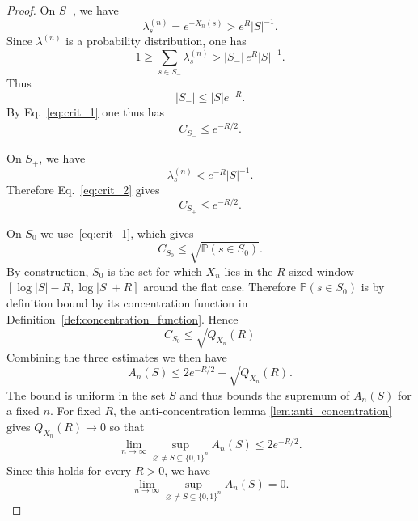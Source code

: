 \documentclass[aps,pra,reprint,superscriptaddress]{revtex4-2}
\newcommand{\nocontentsline}[3]{}
\newcommand\stoptoc{\let\addcontentsline\nocontentsline}
\theoremstyle{definition}
\theoremstyle{remark}
\begin{document}
\begin{proof}
        On \(S_-\), we have
        \begin{equation}
          \lambda_s^{(n)}=e^{-X_n(s)}>e^R|S|^{-1}.
        \end{equation}
        Since \(\lambda^{(n)}\) is a probability distribution, one has
        \begin{equation}
          1
          \ge
          \sum_{s\in S_-}\lambda_s^{(n)}
          >
          |S_-|\,e^R|S|^{-1}.
        \end{equation}
        Thus
        \begin{equation}
          |S_-|\le |S|e^{-R}.
        \end{equation}
        By Eq.~\eqref{eq:crit_1} one thus has
        \begin{align}
          C_{S_-}\le
          e^{-R/2}.
        \end{align}

        On \(S_+\), we have
        \begin{equation}
          \lambda_s^{(n)}<e^{-R}|S|^{-1}.
        \end{equation}
        Therefore Eq.~\eqref{eq:crit_2} gives
        \begin{equation}
          C_{S_+} \le  e^{-R/2}.
        \end{equation}

        On \(S_0\) we use~\eqref{eq:crit_1}, which gives
        \begin{equation}
            C_{S_0} \leq \sqrt{\mathbb P(s \in S_0)}.
        \end{equation}
        By construction, $S_0$ is the set for which $X_n$ lies in the
        $R$-sized window $[\log|S|-R,\log|S|+R]$ around the flat case. Therefore $\mathbb{P}(s \in S_0)$ is by definition bound by its
        concentration function in Definition~\ref{def:concentration_function}.
        Hence
          \begin{equation}
              C_{S_0} \leq \sqrt{Q_{X_n}(R)}
          \end{equation}
        Combining the three estimates we then have
        \begin{equation}
          A_n(S)
          \le
          2e^{-R/2}+\sqrt{Q_{X_n}(R)}.
        \end{equation}
        The bound is uniform in the set $S$ and thus bounds the supremum of
        $A_n(S)$ for a fixed $n$. For fixed $R$, the anti-concentration
        lemma \ref{lem:anti_concentration} gives $Q_{X_n}(R)\to 0$ so that          
        \begin{equation}
          \lim_{n\to\infty}
          \sup_{\varnothing\neq S\subseteq\{0,1\}^n} A_n(S)
          \leq 2e^{-R/2}.
        \end{equation}
        Since this holds for every $R>0$, we have
        \begin{equation}
          \lim_{n\to\infty}
          \sup_{\varnothing\neq S\subseteq\{0,1\}^n} A_n(S)
          =
          0.
        \end{equation}
    \end{proof}
\endgroup

\stoptoc
\twocolumngrid


\end{document}
